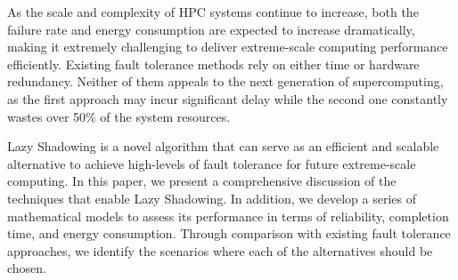 As the scale and complexity of HPC systems continue to increase, both the failure rate and energy consumption are expected to increase dramatically, making it extremely challenging to deliver extreme-scale computing performance efficiently. Existing fault tolerance methods rely on either time or hardware redundancy. Neither of them appeals to the next generation of supercomputing, as the first approach may incur significant delay while the second one constantly wastes over 50\% of the system resources. %

Lazy Shadowing is a novel algorithm that can serve as an efficient and scalable alternative to achieve high-levels of fault tolerance for future extreme-scale computing. In this paper, we present a comprehensive discussion of the techniques that enable Lazy Shadowing. In addition, we develop a series of mathematical models to assess its performance in terms of reliability, completion time, and energy consumption. 
Through comparison with existing fault tolerance approaches, we identify the scenarios where each of the alternatives should be chosen. %

